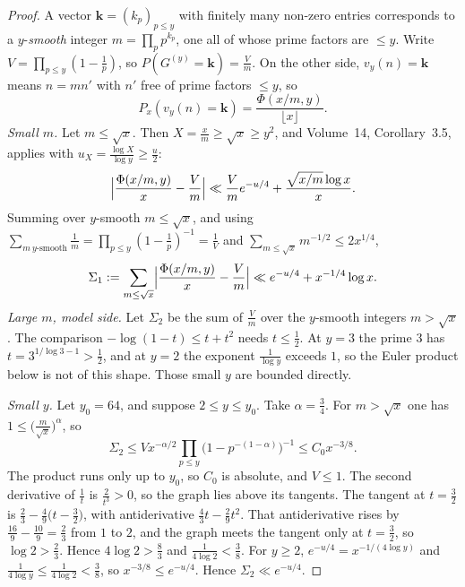 \begin{proof}
A vector $\mathbf k=(k_p)_{p\le y}$ with finitely many non-zero entries corresponds to a $y$-\emph{smooth} integer $m=\prod_pp^{k_p}$, one all of whose prime factors are $\le y$. Write $V=\prod_{p\le y}(1-\frac1p)$, so $P(G^{(y)}=\mathbf k)=\frac Vm$. On the other side, $v_y(n)=\mathbf k$ means $n=mn'$ with $n'$ free of prime factors $\le y$, so
\[
P_x(v_y(n)=\mathbf k)=\frac{\Phi(x/m,y)}{\lfloor x\rfloor}.
\]
\emph{Small $m$.} Let $m\le\sqrt x$. Then $X=\frac xm\ge\sqrt x\ge y^2$, and Volume~14, Corollary~3.5, applies with $u_X=\frac{\log X}{\log y}\ge\frac u2$:
\[
\Bigl|\frac{\Phi(x/m,y)}x-\frac Vm\Bigr|\ll\frac Vme^{-u/4}+\frac{\sqrt{x/m}\log x}x.
\]
Summing over $y$-smooth $m\le\sqrt x$, and using $\sum_{m\ y\text{-smooth}}\frac1m=\prod_{p\le y}(1-\frac1p)^{-1}=\frac1V$ and $\sum_{m\le\sqrt x}m^{-1/2}\le2x^{1/4}$,
\[
\Sigma_1:=\sum_{m\le\sqrt x}\Bigl|\frac{\Phi(x/m,y)}x-\frac Vm\Bigr|\ll e^{-u/4}+x^{-1/4}\log x.
\]
\emph{Large $m$, model side.} Let $\Sigma_2$ be the sum of $\frac Vm$ over the $y$-smooth integers $m>\sqrt x$. The comparison $-\log(1-t)\le t+t^2$ needs $t\le\frac12$. At $y=3$ the prime $3$ has $t=3^{1/\log3-1}>\frac12$, and at $y=2$ the exponent $\frac1{\log y}$ exceeds $1$, so the Euler product below is not of this shape. Those small $y$ are bounded directly.

\emph{Small $y$.} Let $y_0=64$, and suppose $2\le y\le y_0$. Take $\alpha=\frac34$. For $m>\sqrt x$ one has $1\le\bigl(\frac m{\sqrt x}\bigr)^\alpha$, so
\[
\Sigma_2\le Vx^{-\alpha/2}\prod_{p\le y}\bigl(1-p^{-(1-\alpha)}\bigr)^{-1}\le C_0x^{-3/8}.
\]
The product runs only up to $y_0$, so $C_0$ is absolute, and $V\le1$. The second derivative of $\frac1t$ is $\frac2{t^3}>0$, so the graph lies above its tangents. The tangent at $t=\frac32$ is $\frac23-\frac49\bigl(t-\frac32\bigr)$, with antiderivative $\frac43t-\frac29t^2$. That antiderivative rises by $\frac{16}9-\frac{10}9=\frac23$ from $1$ to $2$, and the graph meets the tangent only at $t=\frac32$, so $\log2>\frac23$. Hence $4\log2>\frac83$ and $\frac1{4\log2}<\frac38$. For $y\ge2$, $e^{-u/4}=x^{-1/(4\log y)}$ and $\frac1{4\log y}\le\frac1{4\log2}<\frac38$, so $x^{-3/8}\le e^{-u/4}$. Hence $\Sigma_2\ll e^{-u/4}$.


\end{proof}

